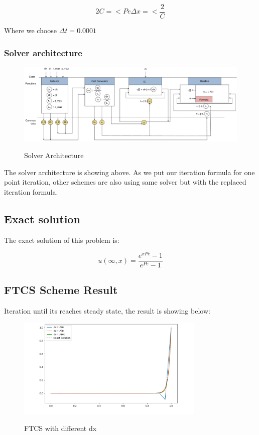 \documentclass[12pt]{article}
\begin{document}
$$
2C =< Pe\Delta x =<\frac{2}{C}
$$

Where we choose  $\Delta t =0.0001$
\subsubsection{Solver architecture}

\begin{figure}[H]
    \centering
    \includegraphics[width=1\textwidth]{figures/Solver_architecture.jpg}
    \label{IGs.jpg}
    \caption{Solver Architecture}
\end{figure}

The solver architecture is showing above. As we put our iteration
formula for one point iteration, other schemes are also using 
same solver but with the replaced iteration formula.




\subsection{Exact solution}

The exact solution of this problem is:


$$
u(\infty,x) = \frac{e^{xPe}-1}{e^{Pe}-1}
$$





\subsection{FTCS Scheme Result}
Iteration until its reaches steady state,
the result is showing below:


\begin{figure}[H]
    \centering
    \includegraphics[width=0.8\textwidth]{figures/P1t0.1All.png}
    \label{IGs.jpg}
    \caption{FTCS with different dx}
\end{figure}
\end{document}
